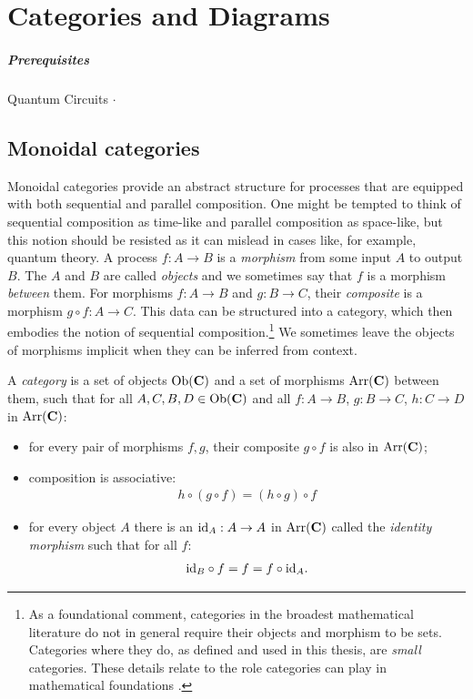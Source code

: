 \chapter{Categories and Diagrams}

\todo{\chapabstract{}}

\paragraph{Prerequisites} Quantum Circuits $\cdot$

\section{Monoidal categories}
Monoidal categories provide an abstract structure for processes that are equipped with both sequential and parallel composition. One might be tempted to think of sequential composition as time-like and parallel composition as space-like, but this notion should be resisted as it can mislead in cases like, for example, quantum theory.  A process $f:A\to B$ is a \emph{morphism} from some input $A$ to output $B$. The $A$ and $B$ are called \emph{objects} and we sometimes say that $f$ is a morphism \emph{between} them. For morphisms $f:A\to B$ and $g:B\to C$, their \emph{composite} is a morphism $g\circ f:A\to C$. This data can be structured into a category, which then embodies the notion of sequential composition.\footnote{As a foundational comment, categories in the broadest mathematical literature do not in general require their objects and morphism to be sets. Categories where they do, as defined and used in this thesis, are \emph{small} categories. These details relate to the role categories can play in mathematical foundations \cite{mac1969one}.} We sometimes leave the objects of morphisms implicit when they can be inferred from context.

\begin{defn}
A \emph{category}  is a set of objects $\mbox{Ob}(\mathbf{C})$ and a set of morphisms $\mbox{Arr}(\mathbf{C})$ between them, such that for all $A,C,B,D\in \mbox{Ob}(\mathbf{C})$ and all $f:A\to B$, $g:B\to C$, $h:C\to D$ in $\mbox{Arr}(\mathbf{C})$:
\begin{itemize}
\item for every pair of morphisms $f,g$, their composite $g\circ f$ is also in $\mbox{Arr}(\mathbf{C})$;
\item composition is associative:
\begin{align}
h\circ(g\circ f) = (h\circ g)\circ f
\end{align}
\item for every object $A$ there is an $\mbox{id}_{A}:A\to A$ in $\mbox{Arr}(\mathbf{C})$ called the \emph{identity morphism} such that for all $f$:
\begin{align}
\mbox{id}_{B}\circ f = f = f\circ\mbox{id}_{A}.
\end{align}
\end{itemize}
\end{defn}

